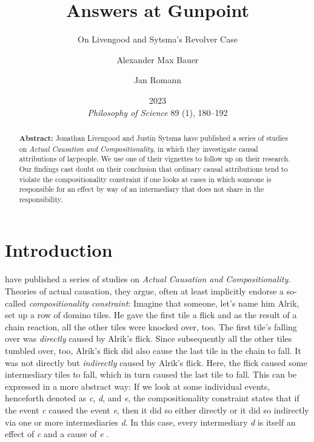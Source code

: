 \documentclass[12pt]{scrartcl}
\title{Answers at Gunpoint}
\subtitle{On Livengood and Sytsma's Revolver Case}
\author[1]{Alexander Max Bauer}
\author[2]{Jan Romann}
\affil[1]{ Department of Philosophy, University of Oldenburg,

Corresponding Author, E-Mail: \href{mailto:alexander.max.bauer@uni-oldenburg.de}{alexander.max.bauer@uni-oldenburg.de}}
\affil[2]{ SOCIUM Research Center on Inequality and Social Policy, University of Bremen}
\date{\small 2023\\\textit{Philosophy of Science} 89 (1), 180--192}
\begin{document}
\maketitle

\begin{abstract}
   \noindent\textbf{\textsf{Abstract:}} Jonathan Livengood and Justin Sytsma have published a series of studies on \textit{Actual Causation and Compositionality}, in which they investigate causal attributions of laypeople. We use one of their vignettes to follow up on their research. Our findings cast doubt on their conclusion that ordinary causal attributions tend to violate the compositionality constraint if one looks at cases in which someone is responsible for an effect by way of an intermediary that does not share in the responsibility.
\end{abstract}

\section{Introduction}
\citet*{livengood_actual_2020} have published a series of studies on \textit{Actual Causation and Compositionality}. Theories of actual causation, they argue, often at least implicitly endorse a so-called \textit{compositionality constraint}: Imagine that someone, let's name him Alrik, set up a row of domino tiles. He gave the first tile a flick and as the result of a chain reaction, all the other tiles were knocked over, too. The first tile's falling over was \textit{directly} caused by Alrik's flick. Since subsequently all the other tiles tumbled over, too, Alrik's flick did also cause the last tile in the chain to fall. It was not directly but \textit{indirectly} caused by Alrik's flick. Here, the flick caused some intermediary tiles to fall, which in turn caused the last tile to fall. This can be expressed in a more abstract way: If we look at some individual events, henceforth denoted as \textit{c}, \textit{d}, and \textit{e}, the compositionality constraint states that if the event \textit{c} caused the event \textit{e}, then it did so either directly or it did so indirectly via one or more intermediaries \textit{d}. In this case, every intermediary \textit{d} is itself an effect of \textit{c} and a cause of \textit{e} \citep[44]{livengood_actual_2020}.
\end{document}
